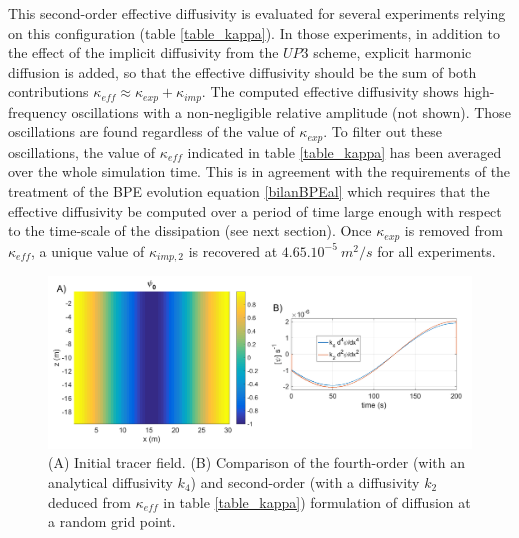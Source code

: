 This second-order effective diffusivity is evaluated for several experiments relying on this configuration (table \ref{table_kappa}). In those experiments, in addition to the effect of the implicit diffusivity from the $UP3$ scheme, explicit harmonic diffusion is added, so that the effective diffusivity should be the sum of both contributions $\kappa_{eff} \approx \kappa_{exp} + \kappa_{imp}$.
The computed effective diffusivity shows high-frequency oscillations with a non-negligible relative amplitude (not shown). Those oscillations are found regardless of the value of $\kappa_{exp}$. To filter out these oscillations, the value of $\kappa_{eff}$ indicated in table \ref{table_kappa} has been averaged over the whole simulation time. This is in agreement with the requirements of the treatment of the BPE evolution equation \ref{bilanBPEal} which requires that the effective diffusivity be computed over a period of time large enough with respect to the time-scale of the dissipation (see next section).
Once $\kappa_{exp}$ is removed from $\kappa_{eff}$, a unique value of $\kappa_{imp,2}$ is recovered at $4.65.10^{-5}\ m^2/s$ for all experiments.

\begin{figure}[h!]
\centering
\includegraphics[width=1\textwidth]{./CHAP_BPE/AGBPE_numlab5.png}
\caption[Initial field and comparison of coefficient $k_2$ and $k_4$ for configuration $BPE_{imp}$ with RK3-UP3 schemes]{(A) Initial tracer field. (B) Comparison of the fourth-order (with an analytical diffusivity $k_4$) and second-order (with a diffusivity $k_2$ deduced from $\kappa_{eff}$ in table \ref{table_kappa}) formulation of diffusion at a random grid point.}
\label{fig5numlab}
\end{figure}

